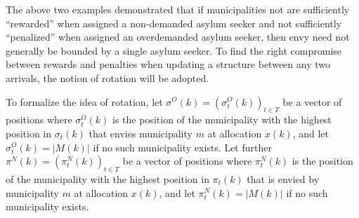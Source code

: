 \documentclass[12pt,fleqn]{article}
\begin{document}
\noindent The above two examples demonstrated that if municipalities not are sufficiently ``rewarded'' when assigned a non-demanded asylum seeker and not sufficiently ``penalized'' when assigned an overdemanded asylum seeker, then envy need not generally be bounded by a single asylum seeker. To find the right compromise between rewards and penalties when updating a structure between any two arrivals, the notion of rotation will be adopted.

To formalize the idea of rotation, let $\sigma^{O}(k)=(\sigma^O_t(k))_{t\in T}$ be a vector of positions where $\sigma^O_t(k)$ is the position of the municipality with the highest position in $\sigma_t(k)$ that envies municipality $m$ at allocation $x(k)$, and let $\sigma^{O}_t(k)=|M(k)|$ if no such municipality exists. Let further $\pi^{N}(k)=(\pi^N_t(k))_{t\in T}$ be a vector of positions where $\pi^N_t(k)$ is the position of the municipality with the highest position in $\pi_t(k)$ that is envied by municipality $m$ at allocation $x(k)$, and let $\pi^{N}_t(k)=|M(k)|$ if no such municipality exists.
\end{document}

